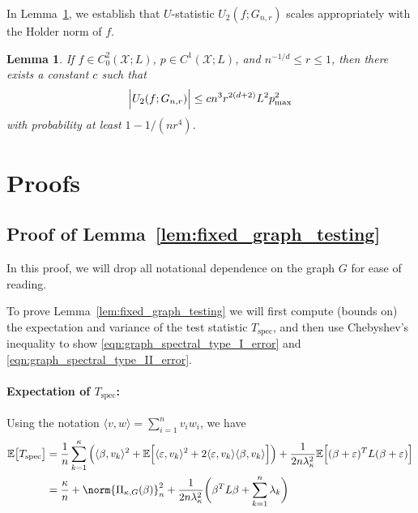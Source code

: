\documentclass{article}
\newcommand{\1}{\mathbf{1}}
\newcommand{\Ebb}{\mathbb{E}}
\newcommand{\dotp}[2]{\langle #1, #2 \rangle}
\newcommand{\spec}{\mathrm{spec}}
\theoremstyle{alden}
\theoremstyle{aldenthm}
\newtheorem{lemma}{Lemma}
\theoremstyle{definition}
\theoremstyle{remark}
\begin{document}
In Lemma~\ref{lem:graph_sobolev_seminorm}, we establish that $U$-statistic $U_2(f;G_{n,r})$ scales appropriately with the Holder norm of $f$.

\begin{lemma}
	\label{lem:graph_sobolev_seminorm}
	If $f \in C_0^2(\mathcal{X};L)$, $p \in C^1(\mathcal{X};L)$, and $n^{-1/d} \leq r \leq 1$, then there exists a constant $c$ such that
	\begin{equation*}
	\Bigl|U_2(f;G_{n,r})\Bigr| \leq c n^3 r^{2(d + 2)} L^2 p_{\max}^2
	\end{equation*}
	with probability at least $1 - 1/(nr^4)$.
\end{lemma}

\section{Proofs}

\subsection{Proof of Lemma~\ref{lem:fixed_graph_testing}}

In this proof, we will drop all notational dependence on the graph $G$ for ease of reading. 

To prove Lemma~\ref{lem:fixed_graph_testing} we will first compute (bounds on) the expectation and variance of the test statistic $T_{\mathrm{spec}}$, and then use Chebyshev's inequality to show \eqref{eqn:graph_spectral_type_I_error} and \eqref{eqn:graph_spectral_type_II_error}.

\paragraph{Expectation of $T_{\mathrm{spec}}$:} Using the notation $\dotp{v}{w} = \sum_{i = 1}^{n} v_iw_i$, we have
\begin{align*}
\Ebb\bigl[T_{\spec}\bigr] & = \frac{1}{n}\sum_{k = 1}^{\kappa}\left( \dotp{\beta}{v_k}^2 + \Ebb\Bigl[ \dotp{\varepsilon}{v_k}^2 + 2 \dotp{\varepsilon}{v_k} \dotp{\beta}{v_k}\Bigr]\right) + \frac{1}{2 n\lambda_{\kappa}^2} \Ebb \Bigl[(\beta + \varepsilon)^T L (\beta + \varepsilon)\Bigr] \\
& = \frac{\kappa}{n} + \norm{\Pi_{\kappa,G}(\beta)}_n^2 + \frac{1}{2 n\lambda_{\kappa}^2}\biggl(\beta^T L \beta + \sum_{k = 1}^{n}\lambda_k\biggr)
\end{align*}
\end{document}
